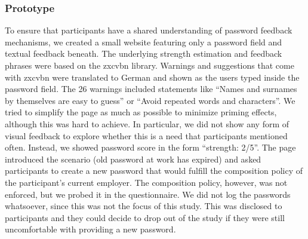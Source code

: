 
\subsubsection{Prototype}
To ensure that participants have a shared understanding of password feedback mechanisms, we created a small website featuring only a password field and textual feedback beneath. The underlying strength estimation and feedback phrases were based on the zxcvbn library. Warnings and suggestions that come with zxcvbn were translated to German and shown as the users typed inside the password field. The 26 warnings included statements like ``Names and surnames by themselves are easy to guess'' or ``Avoid repeated words and characters''. We tried to simplify the page as much as possible to minimize priming effects, although this was hard to achieve. In particular, we did not show any form of visual feedback to explore whether this is a need that participants mentioned often. Instead, we showed password score in the form ``strength: 2/5''.  The page introduced the scenario (old password at work has expired) and asked participants to create a new password that would fulfill the composition policy of the participant's current employer. The composition policy, however, was not enforced, but we probed it in the questionnaire. We did not log the passwords whatsoever, since this was not the focus of this study. This was disclosed to participants and they could decide to drop out of the study if they were still uncomfortable with providing a new password.  

